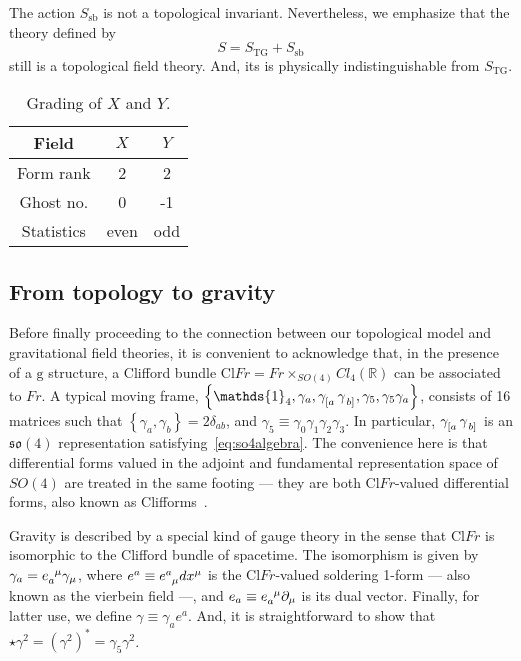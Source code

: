 \documentclass[../main.tex]{subfiles}
\begin{document}
The action $S_{\text{sb}}$ is not a topological invariant. Nevertheless, we emphasize that the theory defined by
\begin{equation}
  \label{eq:tg+sb}
  S=S_{\text{TG}}+S_{\text{sb}}
\end{equation}
still is a topological field theory. And, its is physically indistinguishable from $S_{\text{TG}}$.
\begin{table}[htpb]
  \caption{Grading of $X$ and $Y$.}%
  \label{tab:grading2}
  \begin{tabular}{ccc}
    \toprule
    Field      & $X$  & $Y$ \\
    \midrule
    Form rank  & 2    & 2   \\
    Ghost no.  & 0    & -1  \\
    Statistics & even & odd \\
    \bottomrule
  \end{tabular}
\end{table}

\subsection{From topology to gravity}%
\label{ssec:from_top_to_grav;sec:top_grav}

Before finally proceeding to the connection between our topological model and gravitational field theories, it is convenient to acknowledge that, in the presence of a $ \mathrm{g} $ structure, a Clifford bundle $ \mathrm{Cl} Fr= Fr \times_{SO(4)}Cl_4 \left( \mathbb{R} \right)$ can be associated to $ Fr $. A typical moving frame, $\left\{ \mathds{1}_4, \gamma_a, \tensor{ \gamma }{ _{ \left[ a \right. } } \tensor{ \gamma }{ _{ \left. b \right] } }, \gamma_5, \gamma_5 \gamma_a \right\}$, consists of 16 matrices such that $ \left\{ \gamma_a, \gamma_b \right\} = 2 \delta_{ab}$, and $\gamma_5 \equiv \gamma_0 \gamma_1 \gamma_2 \gamma_3 $. In particular, $\tensor{ \gamma }{ _{ \left[ a \right. } } \tensor{ \gamma }{ _{ \left. b \right] } }$ is an $\mathfrak{so}\left( 4 \right)$ representation satisfying~\eqref{eq:so4algebra}. The convenience here is that differential forms valued in the adjoint and fundamental representation space of $SO(4)$ are treated in the same footing --- they are both $ \mathrm{Cl}Fr $-valued differential forms, also known as Clifforms~\cite{benn1987a,mielke2001a,mielke2017a}. %

Gravity is described by a special kind of gauge theory in the sense that $ \mathrm{Cl}Fr $ is isomorphic to the Clifford bundle of spacetime. The isomorphism is given by $\gamma_a = \tensor{ e }{ _a^\mu } \gamma_\mu $, where $e^a \equiv \tensor{ e }{ ^a_\mu } dx^\mu $ is the $\mathrm{Cl}Fr$-valued soldering 1-form --- also known as the vierbein field ---, and $ e_a \equiv \tensor{ e }{ _a^\mu }\partial_{ \mu }$ is its dual vector. Finally, for latter use, we define $ \gamma \equiv \gamma_a e^a $. And, it is straightforward to show that $\star \gamma^2 = {\left( \gamma^2 \right)}^*= \gamma_5 \gamma^2$.
\end{document}
